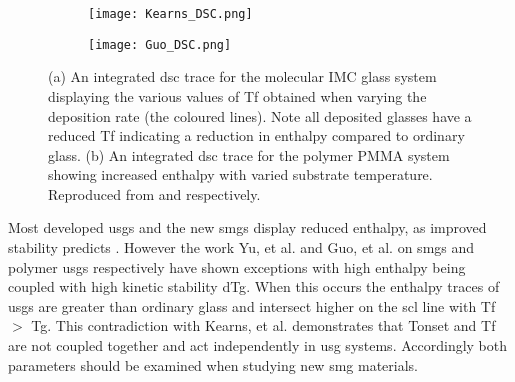 \documentclass[a4paper,12pt,oneside]{report}%
\begin{document}
\begin{figure}[bp]
	\centering
	\begin{subfigure}[htbp]{0.70\textwidth}
		\texttt{[image: Kearns\_DSC.png]}
		\caption{}
		\label{fig:DSC_IMC}
	\end{subfigure}
	\begin{subfigure}[htbp]{0.70\textwidth}
		\texttt{[image: Guo\_DSC.png]}
		\caption{}
		\label{fig:DSC_PMMA}
	\end{subfigure}
	\caption[(a) An integrated \acrshort{dsc} trace for the molecular IMC glass system displaying the various values of \acrshort{Tf} obtained when varying the deposition rate (the coloured lines). Note all deposited glasses have a reduced \acrshort{Tf} indicating a reduction in enthalpy compared to ordinary glass. (b) An integrated \acrshort{dsc} trace for the polymer PMMA system showing increased enthalpy with varied substrate temperature.]{(a) An integrated \acrshort{dsc} trace for the molecular IMC glass system displaying the various values of \acrshort{Tf} obtained when varying the deposition rate (the coloured lines). Note all deposited glasses have a reduced \acrshort{Tf} indicating a reduction in enthalpy compared to ordinary glass. (b) An integrated \acrshort{dsc} trace for the polymer PMMA system showing increased enthalpy with varied substrate temperature. Reproduced from \cite{Kearns2008} and \cite{Guo2012} respectively.}%
	\label{fig:DSC_IMC_PMMA}
\end{figure} 

Most developed \glspl{usg} and the new \glspl{smg} display reduced enthalpy, as improved stability predicts \cite{Aji2013, Wang2014}. However the work Yu, et al. \cite{Yu2013} and Guo, et al. \cite{Guo2012} on \glspl{smg} and polymer \glspl{usg} respectively have shown exceptions with high enthalpy being coupled with high kinetic stability \gls{dTg}. When this occurs the enthalpy traces of \glspl{usg} are greater than ordinary glass and intersect higher on the \gls{scl} line with \gls{Tf} $>$ \gls{Tg}. This contradiction with Kearns, et al. \cite{Kearns2008} demonstrates that \gls{Tonset} and \gls{Tf} are not coupled together and act independently in \gls{usg} systems. Accordingly both parameters should be examined when studying new \gls{smg} materials. 
\end{document}
